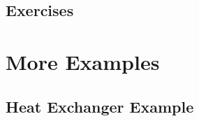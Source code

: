 \documentclass[twoside]{book}\usepackage[]{graphicx}\usepackage[]{xcolor}
\newcommand{\Rindex}[1]{\index{\texttt{#1}}}
\newcommand{\dataframe}[1]{{\color{blue!80!black}\texttt{#1}}\Rindex{#1}}
\newcommand{\pkg}[1]{{\color{red!80!black}\texttt{#1}}\Rindex{#1}}
\newif\ifsolutions
\newif\ifsolutionslocal
\begin{document}

\newpage
\section{Exercises}
\shipoutProblems


\ifsolutions
\ifsolutionslocal
\newpage
\section*{Solutions}
\shipoutSolutions
\fi
\fi




\chapter{More Examples}

\section{Heat Exchanger Example}
\end{document}
